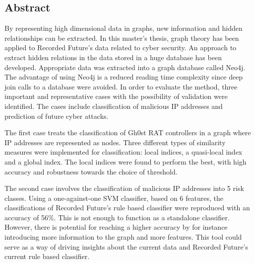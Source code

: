 
\noindent
\begin{comment}
\thesistitle\\
\thesissubtitle\\
\whatthisis\\
\\
\large{%
    Henrik Adolfsson\\
	Josephine Cuellar Andersson\\
}\\
\\
\large{%
	\whereandwhen
}
\vfill
\end{comment}

\begin{center}
    \section*{Abstract}
\end{center}

By representing high dimensional data in graphs, new information and hidden relationships can be extracted. In this master's thesis, graph theory has been applied to Recorded Future's data related to cyber security. An approach to extract hidden relations in the data stored in a huge database has been developed. Appropriate data was extracted into a graph database called Neo4j. The advantage of using Neo4j is a reduced reading time complexity since deep join calls to a database were avoided. In order to evaluate the method, three important and representative cases with the possibility of validation were identified. The cases include classification of malicious IP addresses and prediction of future cyber attacks. 

The first case treats the classification of Gh0st RAT controllers in a graph where IP addresses are represented as nodes. Three different types of similarity measures were implemented for classification: local indices, a quasi-local index and a global index. The local indices were found to perform the best, with high accuracy and robustness towards the choice of threshold.

The second case involves the classification of malicious IP addresses into 5 risk classes. Using a one-against-one SVM classifier, based on 6 features, the classifications of Recorded Future's rule based classifier were reproduced with an accuracy of 56\%. This is not enough to function as a standalone classifier. However, there is potential for reaching a higher accuracy by for instance introducing more information to the graph and more features. This tool could serve as a way of driving insights about the current data and Recorded Future's current rule based classifier.

